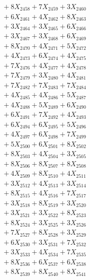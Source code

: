 \documentclass[a4paper,10pt]{article}
\begin{document}
{\begin{align}
&\;  + 8 X_{2458} + 7 X_{2459} + 3 X_{2460} \\[0.3ex]
&\;  + 6 X_{2461} + 4 X_{2462} + 8 X_{2463} \\[0.3ex]
&\;  + 3 X_{2464} + 3 X_{2465} + 6 X_{2466} \\[0.3ex]
&\;  + 3 X_{2467} + 3 X_{2468} + 6 X_{2469} \\[0.5ex]\allowbreak
&\;  + 8 X_{2470} + 4 X_{2471} + 5 X_{2472} \\[0.3ex]
&\;  + 4 X_{2473} + 6 X_{2474} + 4 X_{2475} \\[0.3ex]
&\;  + 7 X_{2476} + 4 X_{2477} + 4 X_{2478} \\[0.3ex]
&\;  + 7 X_{2479} + 3 X_{2480} + 4 X_{2481} \\[0.3ex]
&\;  + 7 X_{2482} + 7 X_{2483} + 7 X_{2484} \\[0.3ex]
&\;  + 4 X_{2485} + 4 X_{2486} + 5 X_{2487} \\[0.3ex]
&\;  + 4 X_{2488} + 5 X_{2489} + 6 X_{2490} \\[0.3ex]
&\;  + 6 X_{2491} + 7 X_{2492} + 4 X_{2493} \\[0.3ex]
&\;  + 6 X_{2494} + 6 X_{2495} + 5 X_{2496} \\[0.3ex]
&\;  + 4 X_{2497} + 6 X_{2498} + 7 X_{2499} \\[0.5ex]\allowbreak
&\;  + 5 X_{2500} + 6 X_{2501} + 8 X_{2502} \\[0.3ex]
&\;  + 8 X_{2503} + 4 X_{2504} + 3 X_{2505} \\[0.3ex]
&\;  + 8 X_{2506} + 8 X_{2507} + 8 X_{2508} \\[0.3ex]
&\;  + 4 X_{2509} + 8 X_{2510} + 4 X_{2511} \\[0.3ex]
&\;  + 3 X_{2512} + 4 X_{2513} + 3 X_{2514} \\[0.3ex]
&\;  + 8 X_{2515} + 4 X_{2516} + 7 X_{2517} \\[0.3ex]
&\;  + 3 X_{2518} + 8 X_{2519} + 3 X_{2520} \\[0.3ex]
&\;  + 3 X_{2521} + 3 X_{2522} + 8 X_{2523} \\[0.3ex]
&\;  + 8 X_{2524} + 3 X_{2525} + 3 X_{2526} \\[0.3ex]
&\;  + 7 X_{2527} + 8 X_{2528} + 3 X_{2529} \\[0.5ex]\allowbreak
&\;  + 6 X_{2530} + 3 X_{2531} + 7 X_{2532} \\[0.3ex]
&\;  + 3 X_{2533} + 4 X_{2534} + 7 X_{2535} \\[0.3ex]
&\;  + 8 X_{2536} + 6 X_{2537} + 6 X_{2538} \\[0.3ex]
&\;  + 8 X_{2539} + 8 X_{2540} + 8 X_{2541} \\[0.3ex]

\end{align}}
\end{document}
